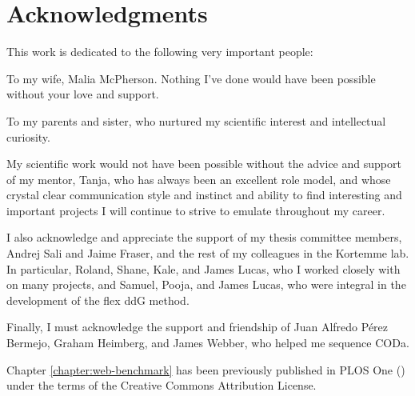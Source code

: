 \chapter*{Acknowledgments}

This work is dedicated to the following very important people:

To my wife, Malia McPherson. Nothing I've done would have been possible without your love and support.

To my parents and sister, who nurtured my scientific interest and intellectual curiosity.

My scientific work would not have been possible without the advice and support of my mentor, Tanja, who has always been an excellent role model, and whose crystal clear communication style and instinct and ability to find interesting and important projects I will continue to strive to emulate throughout my career.

I also acknowledge and appreciate the support of my thesis committee members, Andrej Sali and Jaime Fraser, and the rest of my colleagues in the Kortemme lab.
In particular, Roland, Shane, Kale, and James Lucas, who I worked closely with on many projects, and Samuel, Pooja, and James Lucas, who were integral in the development of the flex ddG method.

Finally, I must acknowledge the support and friendship of Juan Alfredo Pérez Bermejo, Graham Heimberg, and James Webber, who helped me sequence CODa.

Chapter \ref{chapter:web-benchmark} has been previously published in PLOS One (\citet{conchuir_web_2015}) under the terms of the Creative Commons Attribution License.
